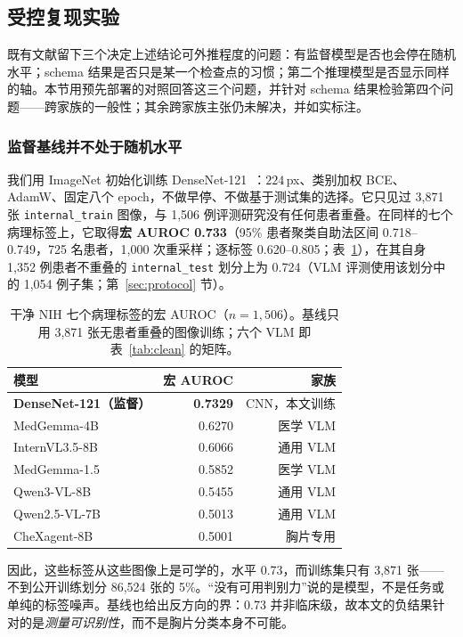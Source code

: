\subsection{受控复现实验}
\label{sec:results-round2}

既有文献留下三个决定上述结论可外推程度的问题：有监督模型是否也会停在随机水平；schema 结果是否只是某一个检查点的习惯；第二个推理模型是否显示同样的轴。本节用预先部署的对照回答这三个问题，并针对 schema 结果检验第四个问题——跨家族的一般性；其余跨家族主张仍未解决，并如实标注。

\subsubsection{监督基线并不处于随机水平}
\label{sec:results-baseline}

我们用 ImageNet 初始化训练 DenseNet-121~\citep{huang2017densely}：$224$\,px、类别加权 BCE、AdamW、固定八个 epoch，不做早停、不做基于测试集的选择。它只见过 3,871 张 \texttt{internal\_train} 图像，与 1,506 例评测研究没有任何患者重叠。在同样的七个病理标签上，它取得\textbf{宏 AUROC 0.733}（95\% 患者聚类自助法区间 0.718--0.749，725 名患者，1,000 次重采样；逐标签 0.620--0.805；表~\ref{tab:baseline}），在其自身 1,352 例患者不重叠的 \texttt{internal\_test} 划分上为 0.724（VLM 评测使用该划分中的 1,054 例子集；第~\ref{sec:protocol} 节）。

\begin{table}[t]
\centering
\small
\caption{干净 NIH 七个病理标签的宏 AUROC（$n=1{,}506$）。基线只用 3,871 张无患者重叠的图像训练；六个 VLM 即表~\ref{tab:clean} 的矩阵。}
\label{tab:baseline}
\begin{tabular}{lrr}
\toprule
模型 & 宏 AUROC & 家族 \\
\midrule
\textbf{DenseNet-121（监督）} & \textbf{0.7329} & CNN，本文训练 \\
MedGemma-4B & 0.6270 & 医学 VLM \\
InternVL3.5-8B & 0.6066 & 通用 VLM \\
MedGemma-1.5 & 0.5852 & 医学 VLM \\
Qwen3-VL-8B & 0.5455 & 通用 VLM \\
Qwen2.5-VL-7B & 0.5013 & 通用 VLM \\
CheXagent-8B & 0.5001 & 胸片专用 \\
\bottomrule
\end{tabular}
\end{table}

因此，这些标签从这些图像上是可学的，水平 0.73，而训练集只有 3,871 张——不到公开训练划分 86,524 张的 5\%。``没有可用判别力''说的是模型，不是任务或单纯的标签噪声。基线也给出反方向的界：0.73 并非临床级，故本文的负结果针对的是\emph{测量可识别性}，而不是胸片分类本身不可能。

